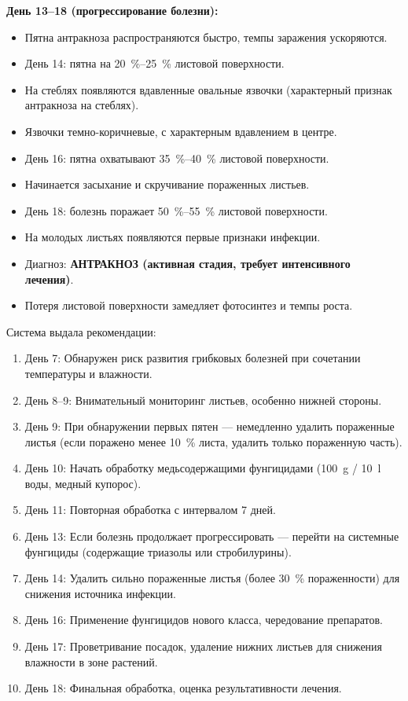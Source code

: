 \textbf{День 13--18 (прогрессирование болезни):}
\begin{itemize}
    \item Пятна антракноза распространяются быстро, темпы заражения ускоряются.
    \item День 14: пятна на \SIrange{20}{25}{\percent} листовой поверхности.
    \item На стеблях появляются вдавленные овальные язвочки (характерный признак антракноза на стеблях).
    \item Язвочки темно-коричневые, с характерным вдавлением в центре.
    \item День 16: пятна охватывают \SIrange{35}{40}{\percent} листовой поверхности.
    \item Начинается засыхание и скручивание пораженных листьев.
    \item День 18: болезнь поражает \SIrange{50}{55}{\percent} листовой поверхности.
    \item На молодых листьях появляются первые признаки инфекции.
    \item Диагноз: \textbf{АНТРАКНОЗ (активная стадия, требует интенсивного лечения)}.
    \item Потеря листовой поверхности замедляет фотосинтез и темпы роста.
\end{itemize}

Система выдала рекомендации:
\begin{enumerate}
    \item День 7: Обнаружен риск развития грибковых болезней при сочетании температуры и влажности.
    \item День 8--9: Внимательный мониторинг листьев, особенно нижней стороны.
    \item День 9: При обнаружении первых пятен --- немедленно удалить пораженные листья (если поражено менее \SI{10}{\percent} листа, удалить только пораженную часть).
    \item День 10: Начать обработку медьсодержащими фунгицидами (\SI{100}{\gram} / \SI{10}{\litre} воды, медный купорос).
    \item День 11: Повторная обработка с интервалом \num{7} дней.
    \item День 13: Если болезнь продолжает прогрессировать --- перейти на системные фунгициды (содержащие триазолы или стробилурины).
    \item День 14: Удалить сильно пораженные листья (более \SI{30}{\percent} пораженности) для снижения источника инфекции.
    \item День 16: Применение фунгицидов нового класса, чередование препаратов.
    \item День 17: Проветривание посадок, удаление нижних листьев для снижения влажности в зоне растений.
    \item День 18: Финальная обработка, оценка результативности лечения.
\end{enumerate}

